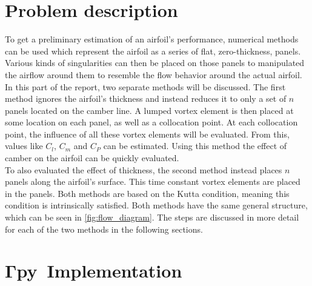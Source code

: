 \newcommand{\gammapy}{$\boldsymbol{\Gamma}$\textbf{py}\ }
\chapter{Problem description}
To get a preliminary estimation of an airfoil's performance, numerical methods
can be used which represent the airfoil as a series of flat, zero-thickness,
panels. Various kinds of singularities can then be placed on those panels to
manipulated the airflow around them to resemble the flow behavior around the
actual airfoil.\\

In this part of the report, two separate methods will be discussed.
The first method ignores the airfoil's thickness and instead reduces it to only
a set of $n$ panels located on the camber line. A lumped vortex element is then
placed at some location on each panel, as well as a collocation point. At each
collocation point, the influence of all these vortex elements will be evaluated.
From this, values like $C_l$, $C_m$ and $C_P$ can be estimated. Using this
method the effect of camber on the airfoil can be quickly evaluated.\\

To also evaluated the effect of thickness, the second method instead places $n$
panels along the airfoil's surface. This time constant vortex elements are
placed in the panels.
Both methods are based on the Kutta condition, meaning this condition is
intrinsically satisfied. Both methods have the same general structure, which can
be seen in \autoref{fig:flow_diagram}. The steps are discussed in more detail
for each of the two methods in the following sections.


\chapter{\gammapy Implementation}

\blindtext


